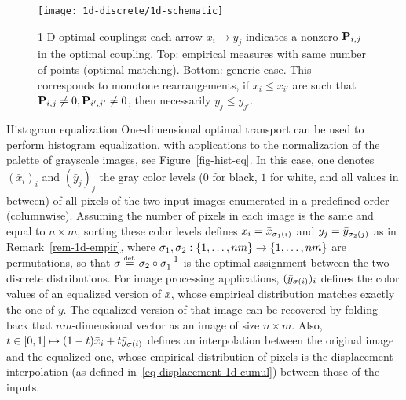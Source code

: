 \begin{figure}[h!]
\centering
\texttt{[image: 1d-discrete/1d-schematic]}
\caption{\label{fig-1d-discrete}
1-D optimal couplings: each arrow $x_i \rightarrow y_j$ indicates a nonzero $\P_{i,j}$ in the optimal coupling.
%
Top: empirical measures with same number of points (optimal matching).
Bottom: generic case.
%
This corresponds to monotone rearrangements, if $x_i \leq x_{i'}$ are such that $\P_{i,j} \neq 0, \P_{i',j'} \neq 0$, then necessarily $y_j \leq y_{j'}$.
}
\end{figure}


\begin{rem1}{Histogram equalization}
One-dimensional op\-ti\-mal tr\-ans\-port can be used to perform histogram equalization, with applications to the normalization of the palette of grayscale images, see Figure~\ref{fig-hist-eq}. In this case, one denotes $(\bar x_i)_i$ and $(\bar y_j)_j$ the gray color levels ($0$ for black, $1$ for white, and all values in between) of all pixels of the two input images enumerated in a predefined order (\ie columnwise). Assuming the number of pixels in each image is the same and equal to $n\times m$, sorting these color levels defines $x_i = \bar x_{\si_1(i)}$ and $y_j = \bar y_{\si_2(j)}$ as in Remark~\ref{rem-1d-empir}, where $\si_1, \si_2 : \{1,\ldots,nm\} \rightarrow \{1,\ldots,nm\}$ are permutations, so that $\si \eqdef \si_2 \circ \si_1^{-1}$ is the optimal assignment between the two discrete distributions. For image processing applications, $(\bar y_{\si(i)})_i$ defines the color values of an equalized version of $\bar x$, whose empirical distribution matches exactly the one of $\bar y$. The equalized version of that image can be recovered by folding back that $nm$-dimensional vector as an image of size $n\times m$. Also, $t \in [0,1] \mapsto (1-t) \bar x_{i} + t \bar y_{\si(i)}$ defines an interpolation between the original image and the equalized one, whose empirical distribution of pixels is the displacement interpolation (as defined in~\eqref{eq-displacement-1d-cumul}) between those of the inputs.
\end{rem1}

